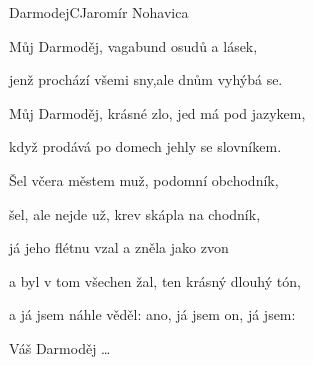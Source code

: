 \begin{song}{Darmodej}{C}{Jaromír Nohavica}
\begin{SBVerse}
  \end{SBVerse}
\begin{SBChorus}
Můj Darmoděj, vagabund osudů a lásek,

jenž prochází všemi sny,ale dnům vyhýbá se.

Můj Darmoděj, krásné zlo, jed má pod jazykem,

když prodává po domech jehly se slovníkem.

\end{SBChorus}
\begin{SBVerse}
Šel včera městem muž, podomní obchodník,

šel, ale nejde už, krev skápla na chodník,

já jeho flétnu vzal a zněla jako zvon

a byl v tom všechen žal, ten krásný dlouhý tón,

a já jsem náhle věděl: ano, já jsem on, já jsem:

  \end{SBVerse}
  
\begin{SBChorus}
Váš Darmoděj \dots
\end{SBChorus}
 \end{song}
\pagebreak
